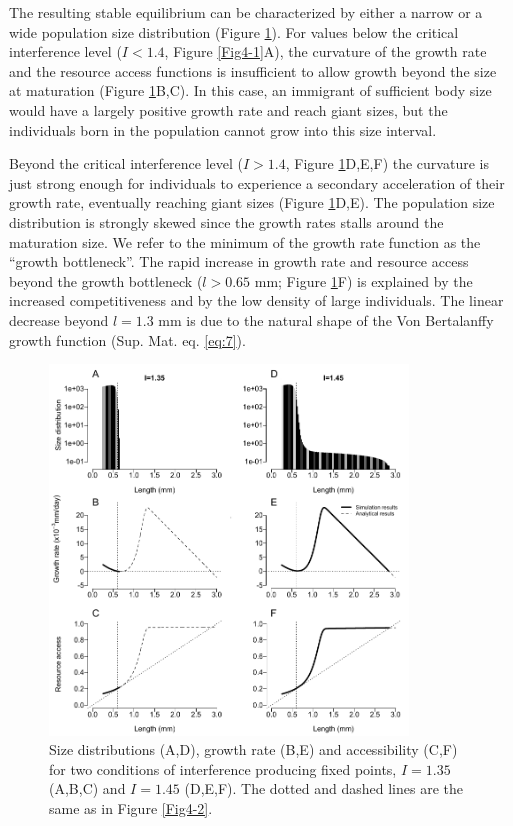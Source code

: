 The resulting stable equilibrium can be characterized by either a narrow or a
wide population size distribution (Figure \ref{Fig4-3}). For values below the
critical interference level ($I<1.4$, Figure \ref{Fig4-1}A), the curvature of
the growth rate and the resource access functions is insufficient to allow
growth beyond the size at maturation (Figure \ref{Fig4-3}B,C). In this case, an
immigrant of sufficient body size would have a largely positive growth rate and
reach giant sizes, but the individuals born in the population cannot grow into
this size interval.

Beyond the critical interference level ($I>1.4$, Figure \ref{Fig4-3}D,E,F) the
curvature is just strong enough for individuals to experience a secondary
acceleration of their growth rate, eventually reaching giant sizes (Figure
\ref{Fig4-3}D,E). The population size distribution is strongly skewed since the
growth rates stalls around the maturation size. We refer to the minimum of the
growth rate function as the “growth bottleneck”. The rapid increase in growth
rate and resource access beyond the growth bottleneck ($l>0.65$ mm; Figure
\ref{Fig4-3}F) is explained by the increased competitiveness and by the low
density of large individuals. The linear decrease beyond $l=1.3$ mm is due to
the natural shape of the Von Bertalanffy growth function (Sup. Mat.
eq. \eqref{eq:7}).

\begin{figure}[!h] %
\centering
\includegraphics[width=0.85\textwidth]{4_ChapThe1/Fig/Fig3.pdf} 
\caption[Sample dynamics for $I=1.35$ and
$I=1.45$]{Size distributions (A,D), growth rate (B,E) and accessibility (C,F)
for two conditions of interference producing fixed points, $I=1.35$ (A,B,C) and
$I=1.45$ (D,E,F). The dotted and dashed lines are the same as in Figure
\ref{Fig4-2}.}
\label{Fig4-3}
\end{figure}

